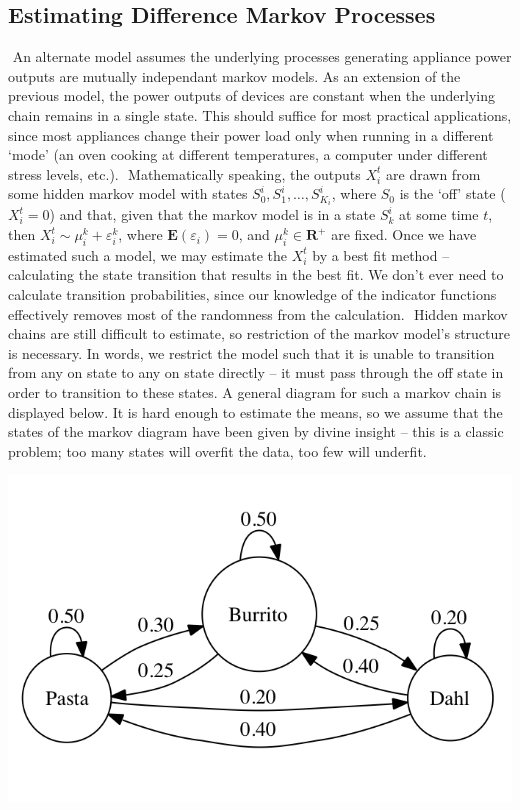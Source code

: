 \documentclass{article}
\begin{document}
\subsection{Estimating Difference Markov Processes}
​
An alternate model assumes the underlying processes generating appliance power outputs are mutually independant markov models. As an extension of the previous model, the power outputs of devices are constant when the underlying chain remains in a single state. This should suffice for most practical applications, since most appliances change their power load only when running in a different `mode' (an oven cooking at different temperatures, a computer under different stress levels, etc.).
​
Mathematically speaking, the outputs $X_i^t$ are drawn from some hidden markov model with states $S^i_0, S^i_1, \dots, S^i_{K_i}$, where $S_0$ is the `off' state ($X_i^t = 0$) and that, given that the markov model is in a state $S^i_k$ at some time $t$, then $X_i^t \sim \mu_i^k + \varepsilon_i^k$, where $\mathbf{E}(\varepsilon_i) = 0$, and $\mu_i^k \in \mathbf{R}^+$ are fixed. Once we have estimated such a model, we may estimate the $X_i^t$ by a best fit method -- calculating the state transition that results in the best fit. We don't ever need to calculate transition probabilities, since our knowledge of the indicator functions effectively removes most of the randomness from the calculation.
​
Hidden markov chains are still difficult to estimate, so restriction of the markov model's structure is necessary. In words, we restrict the model such that it is unable to transition from any on state to any on state directly -- it must pass through the off state in order to transition to these states. A general diagram for such a markov chain is displayed below. It is hard enough to estimate the means, so we assume that the states of the markov diagram have been given by divine insight -- this is a classic problem; too many states will overfit the data, too few will underfit.
%
\begin{center}
\includegraphics[scale = 0.5]{process-probabilities}
\end{center}
\end{document}
